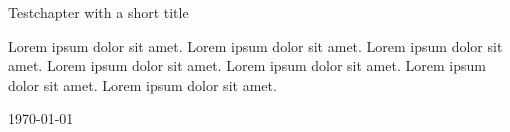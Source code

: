 \beginchapter Testchapter with a short title

Lorem ipsum dolor sit amet. Lorem ipsum dolor sit amet. Lorem ipsum dolor sit amet. Lorem ipsum dolor sit amet. Lorem ipsum dolor sit amet. Lorem ipsum dolor sit amet. Lorem ipsum dolor sit amet. 

\def\idag{\today}

\idag

\endchapter
